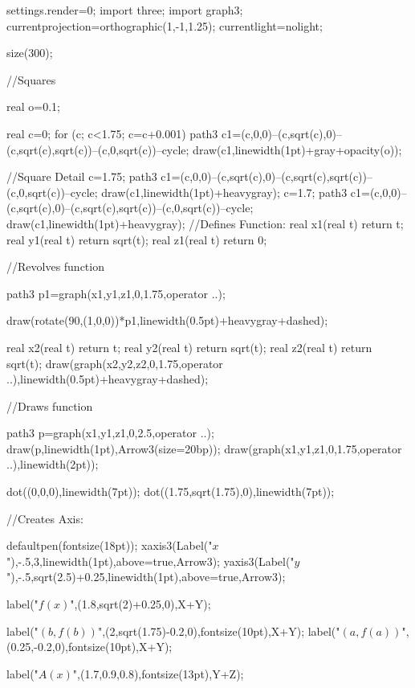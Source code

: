   	settings.render=0;
	import three;
    import graph3;
    currentprojection=orthographic(1,-1,1.25);
    currentlight=nolight;

	size(300);
    
    
    //Squares
    
    real o=0.1;
    
   	real c=0;
    for (c; c<1.75; c=c+0.001)
    {
        path3 c1=(c,0,0)--(c,sqrt(c),0)--(c,sqrt(c),sqrt(c))--(c,0,sqrt(c))--cycle;
    	draw(c1,linewidth(1pt)+gray+opacity(o));
    }
    
    //Square Detail
    	c=1.75;
    	    path3 c1=(c,0,0)--(c,sqrt(c),0)--(c,sqrt(c),sqrt(c))--(c,0,sqrt(c))--cycle;
    		draw(c1,linewidth(1pt)+heavygray);
    	c=1.7;
    	    path3 c1=(c,0,0)--(c,sqrt(c),0)--(c,sqrt(c),sqrt(c))--(c,0,sqrt(c))--cycle;
    		draw(c1,linewidth(1pt)+heavygray);
    //Defines Function:
        real x1(real t) {return t;}
		real y1(real t) {return sqrt(t);}
		real z1(real t) {return 0;}
    
    	//Revolves function        
        
    	path3 p1=graph(x1,y1,z1,0,1.75,operator ..);

        draw(rotate(90,(1,0,0))*p1,linewidth(0.5pt)+heavygray+dashed);
        
            	real x2(real t) {return t;}
				real y2(real t) {return sqrt(t);}
				real z2(real t) {return sqrt(t);}
        draw(graph(x2,y2,z2,0,1.75,operator ..),linewidth(0.5pt)+heavygray+dashed);
    
    
    //Draws function
    
    	path3 p=graph(x1,y1,z1,0,2.5,operator ..);
        draw(p,linewidth(1pt),Arrow3(size=20bp));
        draw(graph(x1,y1,z1,0,1.75,operator ..),linewidth(2pt));
        
        dot((0,0,0),linewidth(7pt));
        dot((1.75,sqrt(1.75),0),linewidth(7pt));	
        

	//Creates Axis:

    defaultpen(fontsize(18pt));
    xaxis3(Label("$x$"),-.5,3,linewidth(1pt),above=true,Arrow3);
    yaxis3(Label("$y$"),-.5,sqrt(2.5)+0.25,linewidth(1pt),above=true,Arrow3);
    
    label("$f(x)$",(1.8,sqrt(2)+0.25,0),X+Y);
    
    label("$(b,f(b))$",(2,sqrt(1.75)-0.2,0),fontsize(10pt),X+Y);
    label("$(a,f(a))$",(0.25,-0.2,0),fontsize(10pt),X+Y);
    
    label("$A(x)$",(1.7,0.9,0.8),fontsize(13pt),Y+Z);
